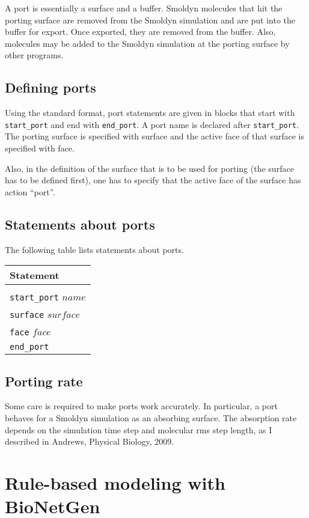 \documentclass {scrbook}
\newcommand {\ttt} {\texttt}
\begin{document}
A port is essentially a surface and a buffer. Smoldyn molecules that hit the porting surface are removed from the Smoldyn simulation and are put into the buffer for export. Once exported, they are removed from the buffer. Also, molecules may be added to the Smoldyn simulation at the porting surface by other programs.

\section{Defining ports}

Using the standard format, port statements are given in blocks that start with \ttt{start\_port} and end with \ttt{end\_port}. A port name is declared after \ttt{start\_port}. The porting surface is specified with surface and the active face of that surface is specified with face.

Also, in the definition of the surface that is to be used for porting (the surface has to be defined first), one has to specify that the active face of the surface has action ``port''.

\section{Statements about ports}

The following table lists statements about ports.

\begin{longtable}[c]{l}
Statement\\
\hline \\
\ttt{start\_port} $name$\\
\ttt{surface} $surface$\\
\ttt{face} $face$\\
\ttt{end\_port}
\end{longtable}

\section{Porting rate}

Some care is required to make ports work accurately. In particular, a port behaves for a Smoldyn simulation as an absorbing surface. The absorption rate depends on the simulation time step and molecular rms step length, as I described in Andrews, Physical Biology, 2009.


\chapter{Rule-based modeling with BioNetGen}
\end{document}
